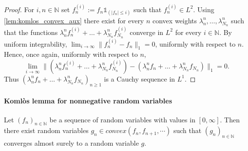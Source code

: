 \begin{proof}
  For $i,n\in\mathbb{N}$ set $f_{n}^{(i)}:=f_n \mathbb{1}_{(|f_n|\leq i)}$ such that $f_{n}^{(i)}\in L^2$.
  Using \ref{lem:komlos_convex_aux} there exist for every $n$ convex weights $\lambda_n^{n}, \ldots, \lambda_{N_n}^{n}$ such that the functions
  $ \lambda_n^{n} f_n^{(i)} + \ldots+\lambda_{N_n}^{n} f_{N_n}^{(i)}$ converge in $L^2$ for every $i\in\mathbb{N}$.
  By uniform integrability, $\lim_{i\to \infty}\| f^{(i)}_n- f_n\|_1=0$, uniformly with respect to $n$.
  Hence, once again, uniformly with respect to $n$,
  $$ \textstyle\lim_{i\to\infty}\|  (\lambda_n^{n} f_n^{(i)} + \ldots+\lambda_{N_n}^{n} f_{N_n}^{(i)})-(\lambda_n^{n} f_n + \ldots+\lambda_{N_n}^{n} f_{N_n})\|_1= 0.$$
  Thus $(\lambda_n^{n} f_n + \ldots+\lambda_{N_n}^{n} f_{N_n})_{n\geq 1}$  is a Cauchy sequence in $L^1$.
\end{proof}


\paragraph{Komlòs lemma for nonnegative random variables}

\begin{lemma}\label{lem:komlos_ennreal}
  \leanok
Let $(f_n)_{n\in\mathbb{N}}$ be a sequence of random variables with values in $[0, \infty]$.
Then there exist random variables $g_n \in convex( f_n, f_{n+1}, \cdots)$ such that $(g_n)_{n\in\mathbb{N}}$ converges almost surely to a random variable $g$.
\end{lemma}

